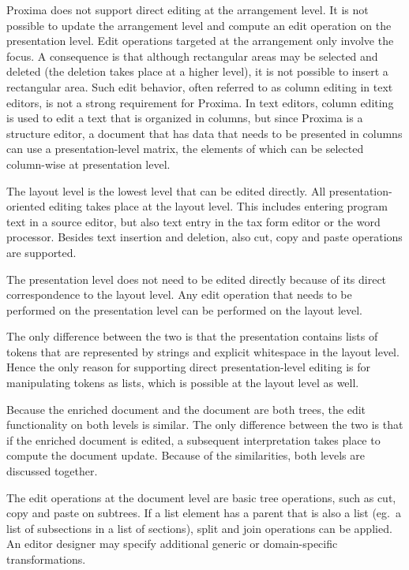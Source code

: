 \documentclass{speauth}
\begin{document}
Proxima does not support direct editing at the arrangement level. It is not possible to update the arrangement level and compute an edit operation on the presentation level. Edit operations targeted at the arrangement only involve the focus. A consequence is that although rectangular areas may be selected and deleted (the deletion takes place at a higher level), it is not possible to insert a rectangular area. Such edit behavior, often referred to as column editing in text editors, is not a strong requirement for Proxima. In text editors, column editing is used to edit a text that is organized in columns, but since Proxima is a structure editor, a document that has data that needs to be presented in columns can use a presentation-level matrix, the elements of which can be selected column-wise at presentation level.



The layout level is the lowest level that can be edited directly. All presentation-oriented editing takes place at the layout level. This includes entering program text in a source editor, but also text entry in the tax form editor or the word processor. Besides text insertion and deletion, also cut, copy and paste operations are supported.


The presentation level does not need to be edited directly because of its direct correspondence to the layout level. Any edit operation that needs to be performed on the presentation level can be performed on the layout level.

\bc The only difference between the two is that the presentation contains lists of tokens that are represented by strings and explicit whitespace in the layout level. Hence the only reason for supporting direct presentation-level editing is for manipulating tokens as lists, which is possible at the layout level as well. \ec


Because the enriched document and the document are both trees, the edit functionality on both levels is similar. The only difference between the two is that if the enriched document is edited, a subsequent interpretation takes place to compute the document update. Because of the similarities, both levels are discussed together.

The edit operations at the document level are basic tree operations, such as cut, copy and paste on subtrees. If a list element has a parent that is also a list (eg.\ a list of subsections in a list of sections), split and join operations can be applied. An editor designer may specify additional generic or domain-specific transformations.
\end{document}
